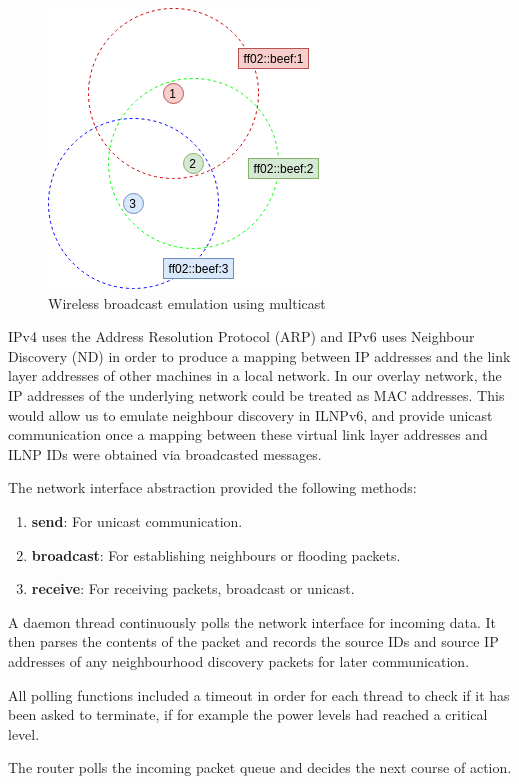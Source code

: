 \documentclass[12pt]{article}
\begin{document}
\begin{figure}[!ht]
	\centering
	\includegraphics[width=0.5\linewidth]{images/mcast}
	\caption{Wireless broadcast emulation using multicast}
	\label{fig:mcast}
\end{figure}

IPv4 uses the Address Resolution Protocol (ARP) and IPv6 uses Neighbour Discovery (ND) in order to produce a mapping between IP addresses and the link layer addresses of other machines in a local network. In our overlay network, the IP addresses of the underlying network could be treated as MAC addresses. This would allow us to emulate neighbour discovery in ILNPv6, and provide unicast communication once a mapping between these virtual link layer addresses and ILNP IDs were obtained via broadcasted messages. 

The network interface abstraction provided the following methods:
\begin{enumerate}
	\item \textbf{send}: For unicast communication.
	\item \textbf{broadcast}: For establishing neighbours or flooding packets.
	\item \textbf{receive}: For receiving packets, broadcast or unicast.
\end{enumerate}

A daemon thread continuously polls the network interface for incoming data. It then parses the contents of the packet and records the source IDs and source IP addresses of any neighbourhood discovery packets for later communication. 

All polling functions included a timeout in order for each thread to check if it has been asked to terminate, if for example the power levels had reached a critical level.

The router polls the incoming packet queue and decides the next course of action. 
\end{document}
